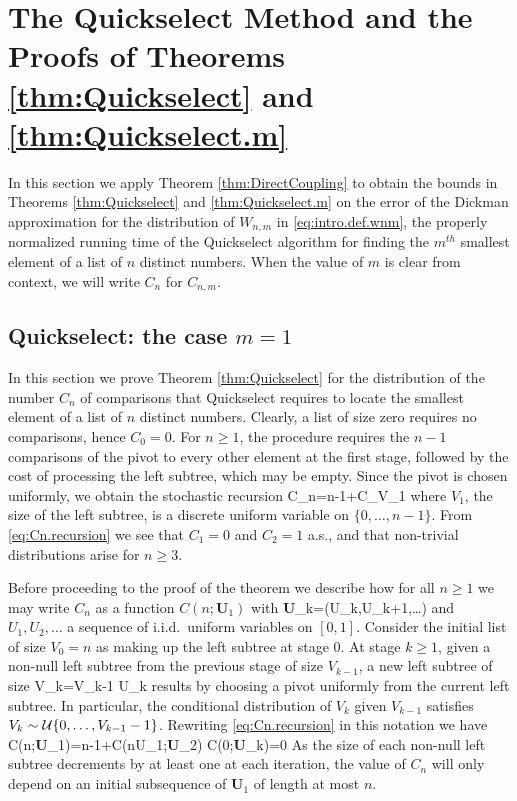 \documentclass[12pt]{article}
\begin{document}
\section{The Quickselect Method and the Proofs of Theorems \ref{thm:Quickselect} and \ref{thm:Quickselect.m}} \label{sec:quick}
In this section we apply Theorem \ref{thm:DirectCoupling} to obtain the bounds in Theorems \ref{thm:Quickselect} and \ref{thm:Quickselect.m} on the error of the Dickman approximation for the distribution of $W_{n,m}$ in \eqref{eq:intro.def.wnm}, the properly normalized running time of the Quickselect algorithm for finding the $m^{th}$ smallest element of a list of $n$ distinct numbers. When the value of $m$ is clear from context, we will write $C_n$ for $C_{n,m}$. 



\subsection{Quickselect: the case $m=1$}
In this section we prove Theorem \ref{thm:Quickselect} for the distribution of the number $C_n$ of comparisons that Quickselect requires to locate the smallest element of a list of $n$ distinct numbers.  Clearly, a list of size zero requires no comparisons, hence $C_0=0$. For $n \ge 1$, the procedure requires the $n-1$ comparisons of the pivot to every other element at the first stage, followed by the cost of processing the left subtree, which may be empty. Since the pivot is chosen uniformly, we obtain the stochastic recursion
\bea \label{eq:Cn.recursion}
C_n=n-1+C_{V_1} 
\ena
where $V_1$, the size of the left subtree, is a discrete uniform variable on $\{0,\ldots,n-1\}$. From \eqref{eq:Cn.recursion} we see that $C_1=0$ and $C_2=1$ a.s., and that non-trivial distributions arise for $n \ge 3$.

Before proceeding to the proof of the theorem we describe how for all $n \ge 1$ we may write $C_n$ as a function $C(n;\textbf{U}_1)$ with
\beas
\textbf{U}_k=(U_k,U_{k+1},\ldots) 
\enas
and $U_1,U_2,\ldots$ a sequence of i.i.d.\  uniform variables on $[0,1]$. 
Consider the initial list of size $V_0=n$ as making up the left subtree at stage 0. At stage $k \ge 1$, given a non-null left subtree from the previous stage of size $V_{k-1}$, a new left subtree of size
\bea \label{def:Uk}
V_k=\lfloor V_{k-1} U_k \rfloor {}
\ena
results by choosing a pivot uniformly from the current left subtree. In particular, the conditional distribution of $V_k$ given $V_{k-1}$ satisfies $V_k \sim {\cal U}\{0,\ldots,V_{k-1}-1\}$. Rewriting \eqref{eq:Cn.recursion} in this notation we have
\bea \label{eq:Cn.V.recursion}
C(n;\textbf{U}_1)=n-1+C(\lfloor nU_1\rfloor ;\textbf{U}_2)  C(0;\textbf{U}_k)=0 
\ena
As the size of each non-null left subtree decrements by at least one at each iteration, the value of $C_n$ will only depend on an initial subsequence of $\textbf{U}_1$ of length at most $n$.
\end{document}
